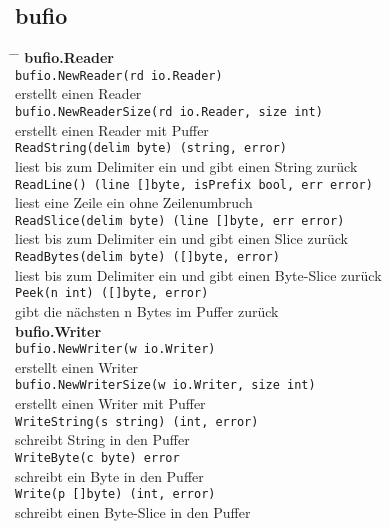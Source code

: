 \documentclass[twoside,a4paper,12pt]{article}
\begin{document}
 \newpage
\subsection{bufio}
\begin{tabbing}
 \hspace{2mm} \= \hspace{50mm} \= \kill
 \> \textbf{bufio.Reader} \\ 
 \> \verb|bufio.NewReader(rd io.Reader)| \\ 
 \> erstellt einen Reader \\
 \> \verb|bufio.NewReaderSize(rd io.Reader, size int)| \\ 
 \> erstellt einen Reader mit Puffer \\ 
 \> \verb|ReadString(delim byte) (string, error)| \\ 
 \> liest bis zum Delimiter ein und gibt einen String zurück \\  
 \> \verb|ReadLine() (line []byte, isPrefix bool, err error)| \\ 
 \> liest eine Zeile ein ohne Zeilenumbruch \\
 \> \verb|ReadSlice(delim byte) (line []byte, err error)| \\ 
 \> liest bis zum Delimiter ein und gibt einen Slice zurück \\ 
 \> \verb|ReadBytes(delim byte) ([]byte, error)| \\ 
 \> liest bis zum Delimiter ein und gibt einen Byte-Slice zurück \\ 
 \> \verb|Peek(n int) ([]byte, error)| \\ 
 \> gibt die nächsten n Bytes im Puffer zurück \\ 
 \> \textbf{bufio.Writer} \\ 
 \> \verb|bufio.NewWriter(w io.Writer)| \\ 
 \> erstellt einen Writer \\ 
 \> \verb|bufio.NewWriterSize(w io.Writer, size int)| \\ 
 \> erstellt einen Writer mit Puffer \\ 
 \> \verb|WriteString(s string) (int, error)| \\ 
 \> schreibt String in den Puffer \\ 
 \> \verb|WriteByte(c byte) error| \\ 
 \> schreibt ein Byte in den Puffer \\ 
 \> \verb|Write(p []byte) (int, error)| \\ 
 \> schreibt einen Byte-Slice in den Puffer \\ 

\end{tabbing}
\end{document}
